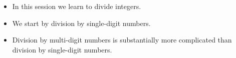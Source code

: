 \begin{frame}
\begin{itemize}
\item In this session we learn to divide integers. 
\item We start by division by single-digit numbers.
\item Division by multi-digit numbers is substantially more complicated than division by single-digit numbers.
\end{itemize}
\end{frame}

